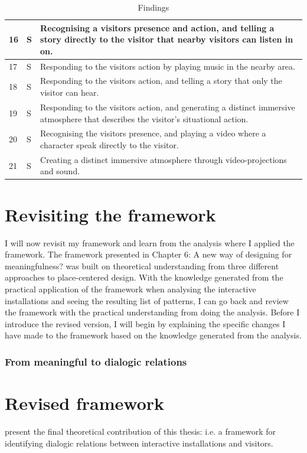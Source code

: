 \begin{table}[H]
\begin{tabular}{| p{0.75cm} | p{1cm} | p{11cm}| }
\hline
16 & S &  Recognising a visitors presence and action, and telling a story directly to the visitor that nearby visitors can listen in on. \\
\hline
17 & S &  Responding to the visitors action by playing music in the nearby area. \\
\hline
18 & S &  Responding to the visitors action, and telling a story that only the visitor can hear. \\
\hline
19 & S &  Responding to the visitors action, and generating a distinct immersive atmosphere that describes the visitor's situational action.\\
\hline
20 & S &  Recognising the visitors presence, and playing a video where a character speak directly to the visitor. \\
\hline
21 & S & Creating a distinct immersive atmosphere through video-projections and sound.  \\
\hline
\end{tabular}
\caption{Findings}
\label{tab:abc}
\end{table}

\section{Revisiting the framework}
I will now revisit my framework and learn from the analysis where I applied the framework. The framework presented in Chapter 6: A new way of designing for meaningfulness? was built on theoretical understanding from three different approaches to place-centered design. With the knowledge generated from the practical application of the framework when analysing the interactive installations and seeing the resulting list of patterns, I can go back and review the framework with the practical understanding from doing the analysis. Before I introduce the revised version, I will begin by explaining the specific changes I have made to the framework based on the knowledge generated from the analysis.

\subsubsection{From meaningful to dialogic relations}
\subsubsection{}


\section{Revised framework}

present the final theoretical contribution of this thesis: i.e. a framework for identifying dialogic relations between interactive installations and visitors.
